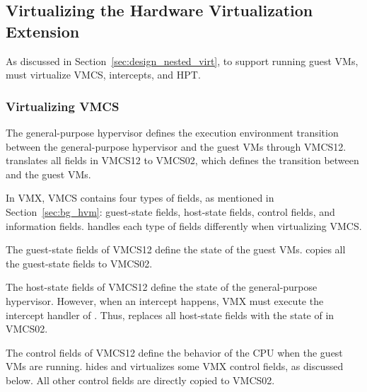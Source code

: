 \subsection{Virtualizing the Hardware Virtualization Extension}
\label{sec:impl_nested_virt}

As discussed in Section~\ref{sec:design_nested_virt}, to support running guest VMs,  must virtualize VMCS, intercepts, and HPT.

\subsubsection{Virtualizing VMCS}

The general-purpose hypervisor defines the execution environment transition between the general-purpose hypervisor and the guest VMs through VMCS12.  translates all fields in VMCS12 to VMCS02, which defines the transition between  and the guest VMs.

In VMX, VMCS contains four types of fields, as mentioned in Section~\ref{sec:bg_hvm}: guest-state fields, host-state fields, control fields, and information fields.  handles each type of fields differently when virtualizing VMCS.

The guest-state fields of VMCS12 define the state of the guest VMs.  copies all the guest-state fields to VMCS02.

The host-state fields of VMCS12 define the state of the general-purpose hypervisor. However, when an intercept happens, VMX must execute the intercept handler of . Thus,  replaces all host-state fields with the state of  in VMCS02.

The control fields of VMCS12 define the behavior of the CPU when the guest VMs are running.  hides and virtualizes some VMX control fields, as discussed below. All other control fields are directly copied to VMCS02.

